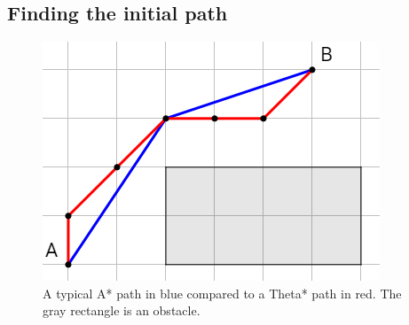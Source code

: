 \subsection{Finding the initial path}


\begin{figure}
    \centering
        \includegraphics[width=0.6\columnwidth]{img/a_theta_star_comp2}
    \caption{A typical A* path in blue compared to a Theta* path in red. The gray rectangle is an obstacle.}\label{fig:pre-comp}
\end{figure}

